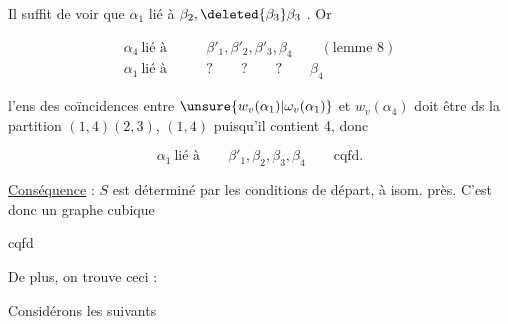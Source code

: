 
Il suffit de voir que $\alpha_1$ lié à $\beta_2,\deleted{\beta_3}\beta_3$ . Or

\[
\begin{aligned}
\alpha_4\ \text{lié à}&\qquad\beta'_1,\beta'_2,\beta'_3,\beta_4\qquad(\text{lemme }8)\\
\alpha_1\ \text{lié à}&\qquad ?\qquad ?\qquad ?\qquad\beta_4
\end{aligned}
\]

 l'ens des coïncidences entre $\unsure{w_v(\alpha_1)|\omega_v(\alpha_1)}$ et $w_v(\alpha_4)$ doit être ds la partition $(1,4)(2,3)$,   $(1,4)$ puisqu'il contient 4, donc

\[
\alpha_1\ \text{lié à}\qquad\beta'_1,\beta_2,\beta_3,\beta_4\qquad\text{cqfd.}
\]

\uline{Conséquence} : $S$ est déterminé par les conditions de départ, à isom. près.  C'est donc un graphe cubique

\begin{center}cqfd\end{center}


De plus, on trouve ceci :

Considérons les  suivants

